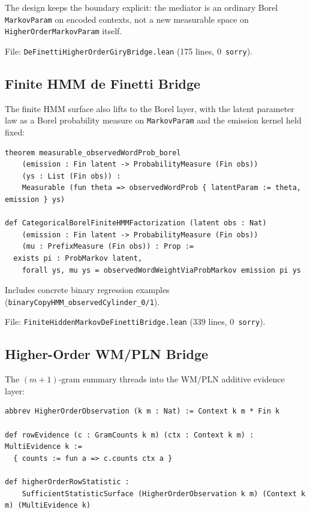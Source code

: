 \documentclass[11pt,a4paper]{article}
\theoremstyle{definition}
\begin{document}
The design keeps the boundary explicit: the mediator is an ordinary Borel
\texttt{MarkovParam} on encoded contexts, not a new measurable space on
\texttt{HigherOrderMarkovParam} itself.

File: \texttt{DeFinettiHigherOrderGiryBridge.lean} (175 lines, 0~\texttt{sorry}).

\subsection{Finite HMM de Finetti Bridge}

The finite HMM surface also lifts to the Borel layer, with the latent
parameter law as a Borel probability measure on \texttt{MarkovParam} and
the emission kernel held fixed:

\begin{lstlisting}
theorem measurable_observedWordProb_borel
    (emission : Fin latent -> ProbabilityMeasure (Fin obs))
    (ys : List (Fin obs)) :
    Measurable (fun theta => observedWordProb { latentParam := theta, emission } ys)

def CategoricalBorelFiniteHMMFactorization (latent obs : Nat)
    (emission : Fin latent -> ProbabilityMeasure (Fin obs))
    (mu : PrefixMeasure (Fin obs)) : Prop :=
  exists pi : ProbMarkov latent,
    forall ys, mu ys = observedWordWeightViaProbMarkov emission pi ys
\end{lstlisting}

Includes concrete binary regression examples (\texttt{binaryCopyHMM\_observedCylinder\_0/1}).

File: \texttt{FiniteHiddenMarkovDeFinettiBridge.lean} (339 lines, 0~\texttt{sorry}).

\subsection{Higher-Order WM/PLN Bridge}

The $(m+1)$-gram summary threads into the WM/PLN additive evidence layer:

\begin{lstlisting}
abbrev HigherOrderObservation (k m : Nat) := Context k m * Fin k

def rowEvidence (c : GramCounts k m) (ctx : Context k m) : MultiEvidence k :=
  { counts := fun a => c.counts ctx a }

def higherOrderRowStatistic :
    SufficientStatisticSurface (HigherOrderObservation k m) (Context k m) (MultiEvidence k)
\end{lstlisting}
\end{document}
